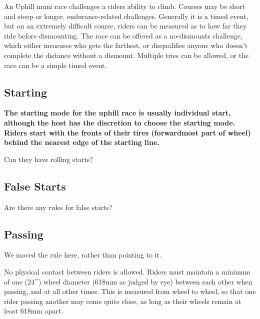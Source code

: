 An Uphill muni race challenges a riders ability to climb.
Courses may be short and steep or longer, endurance-related challenges. 
Generally it is a timed event, but on an extremely difficult course, riders can be measured as to how far they ride before dismounting.
The race can be offered as a no-dismounts challenge, which either measures who gets the farthest, or disqualifies anyone who doesn't complete the distance without a dismount.
Multiple tries can be allowed, or the race can be a simple timed event.

\subsection{Starting}

\textbf{The starting mode for the uphill race is usually individual 
start, although the host has the discretion to choose the starting 
mode. Riders start with the fronts of their tires (forwardmost part of wheel) behind the nearest edge of the starting line.}

\begin{framed}
Can they have rolling starts?
\end{framed}

\subsection{False Starts}

\begin{framed}
Are there any rules for false starts?
\end{framed}

\subsection{Passing}

\begin{framed}
We moved the rule here, rather than pointing to it.
\end{framed}

No physical contact between riders is allowed.
Riders must maintain a minimum of one (24$"$) wheel diameter (618mm as judged by eye) between each other when passing, and at all other times.
This is measured from wheel to wheel, so that one rider passing another may come quite close, as long as their wheels remain at least 618mm apart.

